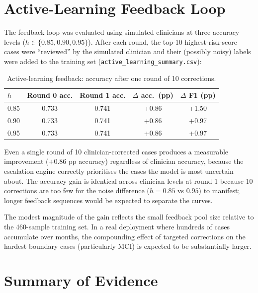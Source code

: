 \documentclass[12pt, a4paper]{report}
\begin{document}
  \section{Active-Learning Feedback Loop}
  \label{sec:active-learning}

  The feedback loop was evaluated using simulated clinicians at three accuracy
  levels ($h \in \{0.85, 0.90, 0.95\}$).  After each round, the top-10
  highest-risk-score cases were ``reviewed'' by the simulated clinician and their
  (possibly noisy) labels were added to the training set
  (\texttt{active\_learning\_summary.csv}):

  \begin{table}[htbp]
    \centering
    \caption{Active-learning feedback: accuracy after one round of 10 corrections.}
    \label{tab:active-learning}
    \begin{tabular}{lSSSS}
      \toprule
      {$h$} & {Round 0 acc.} & {Round 1 acc.} & {$\Delta$ acc.\ (pp)}
        & {$\Delta$ F1 (pp)} \\
       & 0.733 & 0.741 & +0.86 & +1.50 \\
      0.90 & 0.733 & 0.741 & +0.86 & +0.97 \\
      0.95 & 0.733 & 0.741 & +0.86 & +0.97 \\
      \bottomrule
    \end{tabular}
  \end{table}

  Even a single round of 10 clinician-corrected cases produces a measurable
  improvement ($+0.86$ pp accuracy) regardless of clinician accuracy, because the
  escalation engine correctly prioritises the cases the model is most uncertain
  about.  The accuracy gain is identical across clinician levels at round 1 because
  10 corrections are too few for the noise difference ($h = 0.85$ vs $0.95$) to
  manifest; longer feedback sequences would be expected to separate the curves.

  The modest magnitude of the gain reflects the small feedback pool size relative to
  the 460-sample training set.  In a real deployment where hundreds of cases
  accumulate over months, the compounding effect of targeted corrections on the
  hardest boundary cases (particularly MCI) is expected to be substantially larger.

  \section{Summary of Evidence}
  \label{sec:results-summary}
\end{document}
